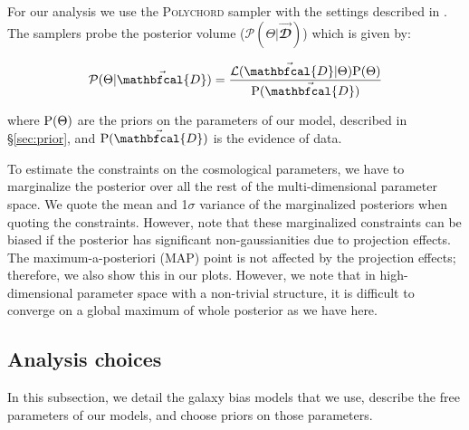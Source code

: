 \documentclass[fleqn,usenatbib]{mnras}
\begin{document}
For our analysis we use the \textsc{Polychord} sampler with the settings described in \cite{y3-samplers}. The samplers probe the posterior volume ($\mathcal{P}(\Theta | \vec{\mathbfcal{D}})$) which is given by:
\begin{linenomath*}
\begin{equation}
    \mathcal{P}(\Theta | \vec{\mathbfcal{D}}) = \frac{\mathcal{L}(\vec{\mathbfcal{D}}|\Theta) {\rm P}(\Theta)}{{\rm P}(\vec{\mathbfcal{D}})}
\end{equation}
\end{linenomath*}
where ${\rm P}(\Theta)$ are the priors on the parameters of our model, described in \S\ref{sec:prior}, and ${\rm P}(\vec{\mathbfcal{D}})$ is the evidence of data. 

To estimate the constraints on the cosmological parameters, we have to marginalize the posterior over all the rest of the multi-dimensional parameter space. We quote the mean and 1$\sigma$ variance of the marginalized posteriors when quoting the constraints. However, note that these marginalized constraints can be biased if the posterior has significant non-gaussianities due to projection effects. The maximum-a-posteriori (MAP) point is not affected by the projection effects; therefore, we also show this in our plots. However, we note that in high-dimensional parameter space with a non-trivial structure, it is difficult to converge on a global maximum of whole posterior as we have here.


\subsection{Analysis choices}
\label{sec:analysis_choices}
In this subsection, we detail the galaxy bias models that we use, describe the free parameters of our models, and choose priors on those parameters. 
\end{document}
